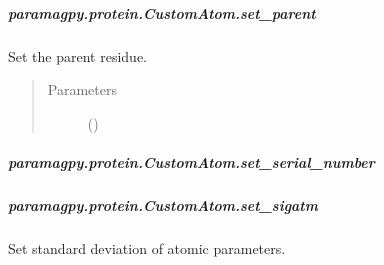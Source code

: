 \documentclass[a4paper,10pt,english,openany,oneside]{sphinxmanual}
\begin{document}
\begin{fulllineitems}
\begin{fulllineitems}
\subparagraph{paramagpy.protein.CustomAtom.set\_parent}
\label{\detokenize{reference/generated/paramagpy.protein.CustomAtom.set_parent:paramagpy-protein-customatom-set-parent}}\label{\detokenize{reference/generated/paramagpy.protein.CustomAtom.set_parent::doc}}

\begin{fulllineitems}
\label{\detokenize{reference/generated/paramagpy.protein.CustomAtom.set_parent:paramagpy.protein.CustomAtom.set_parent}}
Set the parent residue.
\begin{quote}\begin{description}
\item[{Parameters}] \leavevmode
{} (\sphinxstyleliteralemphasis{\sphinxupquote{-}}) \textendash{} 

\end{description}\end{quote}

\end{fulllineitems}



\subparagraph{paramagpy.protein.CustomAtom.set\_serial\_number}
\label{\detokenize{reference/generated/paramagpy.protein.CustomAtom.set_serial_number:paramagpy-protein-customatom-set-serial-number}}\label{\detokenize{reference/generated/paramagpy.protein.CustomAtom.set_serial_number::doc}}

\begin{fulllineitems}
\label{\detokenize{reference/generated/paramagpy.protein.CustomAtom.set_serial_number:paramagpy.protein.CustomAtom.set_serial_number}}
\end{fulllineitems}



\subparagraph{paramagpy.protein.CustomAtom.set\_sigatm}
\label{\detokenize{reference/generated/paramagpy.protein.CustomAtom.set_sigatm:paramagpy-protein-customatom-set-sigatm}}\label{\detokenize{reference/generated/paramagpy.protein.CustomAtom.set_sigatm::doc}}

\begin{fulllineitems}
\label{\detokenize{reference/generated/paramagpy.protein.CustomAtom.set_sigatm:paramagpy.protein.CustomAtom.set_sigatm}}
Set standard deviation of atomic parameters.


\end{fulllineitems}
\end{fulllineitems}
\end{fulllineitems}
\end{document}
